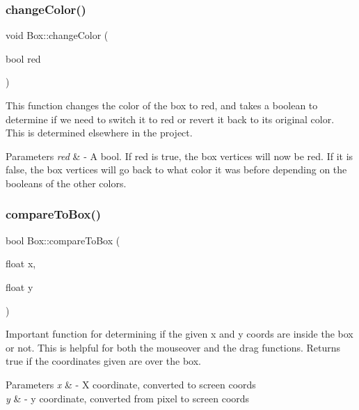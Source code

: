 \subsubsection{\texorpdfstring{change\+Color()}{changeColor()}}
{\footnotesize\ttfamily void Box\+::change\+Color (\begin{DoxyParamCaption}\item[{bool}]{red }\end{DoxyParamCaption})}



This function changes the color of the box to red, and takes a boolean to determine if we need to switch it to red or revert it back to it\textquotesingle{}s original color. This is determined elsewhere in the project. 


\begin{DoxyParams}{Parameters}
{\em red} & -\/ A bool. If red is true, the box vertices will now be red. If it is false, the box vertices will go back to what color it was before depending on the booleans of the other colors. \\
\hline
\end{DoxyParams}
\mbox{\label{class_box_a42ae1534ed54148e5267cffe3f0862e3}} 
\subsubsection{\texorpdfstring{compare\+To\+Box()}{compareToBox()}}
{\footnotesize\ttfamily bool Box\+::compare\+To\+Box (\begin{DoxyParamCaption}\item[{float}]{x,  }\item[{float}]{y }\end{DoxyParamCaption})}



Important function for determining if the given x and y coords are inside the box or not. This is helpful for both the mouseover and the drag functions. Returns true if the coordinates given are over the box. 


\begin{DoxyParams}{Parameters}
{\em x} & -\/ X coordinate, converted to screen coords \\
\hline
{\em y} & -\/ y coordinate, converted from pixel to screen coords \\
\hline
\end{DoxyParams}
\mbox{\label{class_box_afe94c473ef4bb934fc6dd9a554ec4e37}} 
